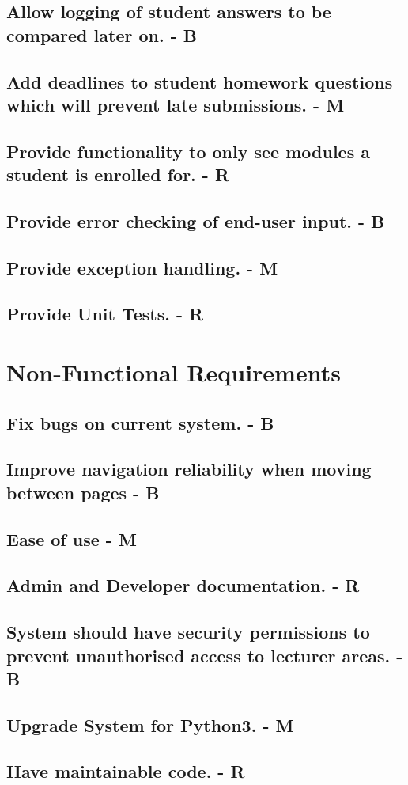 \documentclass[12pt]{article}
\begin{document}
	\subsection{Allow logging of student answers to be compared later on. - B}
	\subsection{Add deadlines to student homework questions which will prevent late submissions. - M}
	\subsection{Provide functionality to only see modules a student is enrolled for. - R}
	\subsection{Provide error checking of end-user input. - B}
	\subsection{Provide exception handling. - M}
	\subsection{Provide Unit Tests. - R}

	\newpage
	
	\section{Non-Functional Requirements}
	\subsection{Fix bugs on current system.  - B}
	\subsection{Improve navigation reliability when moving between pages - B}
	\subsection{Ease of use - M}
	\subsection{Admin and Developer documentation. - R}
	\subsection{System should have security permissions to prevent unauthorised access to lecturer areas. - B}
	\subsection{Upgrade System for Python3. - M}
	\subsection{Have maintainable code. - R}
\end{document}
